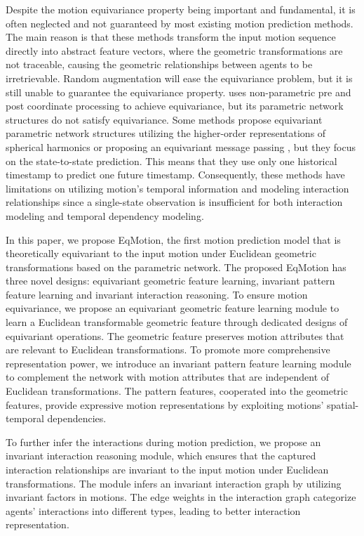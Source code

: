 \documentclass[10pt,twocolumn,letterpaper]{article}
\begin{document}
Despite the motion equivariance property being important and fundamental, it is often neglected and not guaranteed by most existing motion prediction methods. The main reason is that these methods transform the input motion sequence directly into abstract feature vectors, where the geometric transformations are not traceable, causing the geometric relationships between agents to be irretrievable. Random augmentation will ease the equivariance problem, but it is still unable to guarantee the equivariance property.
\cite{kofinas2021roto} uses non-parametric pre and post coordinate processing to achieve equivariance, but its parametric network structures do not satisfy equivariance. Some methods propose equivariant parametric network structures utilizing the higher-order representations of spherical harmonics \cite{thomas2018tensor,fuchs2020se} or proposing an equivariant message passing \cite{satorras2021n}, but they focus on the state-to-state prediction. This means that they use only one historical timestamp to predict one future timestamp. Consequently, these methods have limitations on utilizing motion's temporal information and modeling interaction relationships since a single-state observation is insufficient for both interaction modeling and temporal dependency modeling.


In this paper, we propose EqMotion, the first motion prediction model that is theoretically equivariant to the input motion under Euclidean geometric transformations based on the parametric network. The proposed EqMotion has three novel designs: equivariant geometric feature learning, invariant pattern feature learning and invariant interaction reasoning. 
To ensure motion equivariance, we propose an equivariant geometric feature learning module to learn a Euclidean transformable geometric feature through dedicated designs of equivariant operations. The geometric feature preserves motion attributes that are relevant to Euclidean transformations. To promote more comprehensive representation power, we introduce an invariant pattern feature learning module to complement the network with motion attributes that are independent of Euclidean transformations. The pattern features, cooperated into the geometric features, provide expressive motion representations by exploiting motions' spatial-temporal dependencies. 

To further infer the interactions during motion prediction, we propose an invariant interaction reasoning module, which ensures that the captured interaction relationships are invariant to the input motion under Euclidean transformations. 
The module infers an invariant interaction graph by utilizing invariant factors in motions. The edge weights in the interaction graph categorize agents' interactions into different types, leading to better interaction representation.
\end{document}
